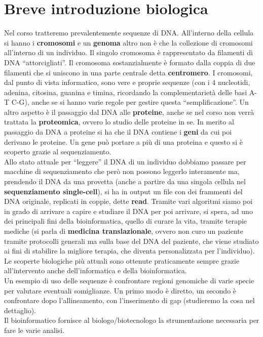 \documentclass[a4paper,12pt, oneside]{book}
\begin{document}
\section{Breve introduzione biologica}
Nel corso tratteremo prevalentemente sequenze di DNA. All'interno della cellula
si hanno i \textbf{cromosomi} e un \textbf{genoma} altro non è che la collezione
di cromosomi all'interno di un individuo. Il singolo cromosoma è rappresentato
da filamenti di DNA ``attorcigliati''. Il cromosoma sostanzialmente è formato
dalla coppia di due filamenti che si uniscono in una parte centrale detta
\textbf{centromero}. I cromosomi, dal punto di vista informatico, sono vere e
proprie sequenze (con i 4 nucleotidi, adenina, citosina, guanina e timina,
ricordando la complementarietà delle basi A-T C-G),
anche se si hanno varie regole per gestire questa 
``semplificazione''. Un altro aspetto è il passaggio dal DNA alle
\textbf{proteine}, anche se nel corso non verrà trattata la \textbf{proteomica},
ovvero lo studio delle proteine in se. In merito al passaggio da DNA a proteine
si ha che il DNA contiene i \textbf{geni} da cui poi derivano le proteine. Un
gene può portare a più di una proteina e questo si è scoperto grazie al
sequenziamento. \\
Allo stato attuale per ``leggere'' il DNA di un individuo dobbiamo passare per
macchine di sequenziamento che però non possono leggerlo interamente ma,
prendendo il DNA da una provetta (anche a partire da una singola cellula nel
\textbf{sequenziamento single-cell}), si ha in output un file con dei frammenti
del DNA originale, replicati in coppie, dette \textbf{read}. Tramite vari
algoritmi siamo poi in grado di arrivare a capire e studiare il DNA per poi
arrivare, si spera, ad uno dei principali fini della bioinformatica, quello di
curare la vita, tramite terapie mediche (si parla di \textbf{medicina
  translazionale}, ovvero non curo un paziente tramite protocolli generali ma
sulla base del DNA del paziente, che viene studiato ai fini di stabilire la
migliore terapia, che diventa personalizzata per l'individuo). Le scoperte
biologiche più attuali sono ottenute praticamente sempre grazie all'intervento
anche dell'informatica e della bioinformatica.\\
Un esempio di uso delle sequenze è confrontare regioni genomiche di varie specie
per valutare eventuali somiglianze. Un primo modo è diretto, un secondo è
confrontare dopo l'allineamento, con l'inserimento di gap (studieremo la cosa
nel dettaglio).\\
Il bioinformatico fornisce al biologo/biotecnologo la strumentazione necessaria
per fare le varie analisi.
\end{document}
